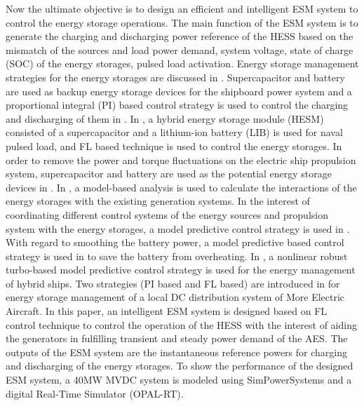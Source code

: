 Now the ultimate objective is to design an efficient and intelligent ESM system to control the energy storage operations. The main function of the ESM system is to generate the charging and discharging power reference of the HESS based on the mismatch of the sources and load power demand, system voltage, state of charge (SOC) of the energy storages, pulsed load activation. Energy storage management strategies for the energy storages are discussed in \cite{li2014real, cohen2016fuzzy, hou2015interaction, hou2016integrated, haseltalab2016multi}. Supercapacitor and battery are used as backup energy storage devices for the shipboard power system and a proportional integral (PI) based control strategy is used to control the charging and discharging of them in \cite{li2014real}. In \cite{cohen2016fuzzy}, a hybrid energy storage module (HESM) consisted of a supercapacitor and a lithium-ion battery (LIB) is used for naval pulsed load, and FL based technique is used to control the energy storages. In order to remove the power and torque fluctuations on the electric ship propulsion system, supercapacitor and battery are used as the potential energy storage devices in \cite{hou2015interaction}. In \cite{hou2015interaction}, a model-based analysis is used to calculate the interactions of the energy storages with the existing generation systems. In the interest of coordinating different control systems of the energy sources and propulsion system with the energy storages, a model predictive control strategy is used in \cite{hou2016integrated}. With regard to smoothing the battery power, a model predictive based control strategy is used in \cite{bo2016battery} to save the battery from overheating. In \cite{haseltalab2016multi}, a nonlinear robust turbo-based model predictive control strategy is used for the energy management of hybrid ships. Two strategies (PI based and FL based) are introduced in \cite{zhang2010experimental} for energy storage management of a local DC distribution system of More Electric Aircraft. In this paper, an intelligent ESM system is designed based on FL control technique to control the operation of the HESS with the interest of aiding the generators in fulfilling transient and steady power demand of the AES. The outputs of the ESM system are the instantaneous reference powers for charging and discharging of the energy storages. To show the performance of the designed ESM system, a 40MW MVDC system is modeled using SimPowerSystems and a digital Real-Time Simulator (OPAL-RT). 


